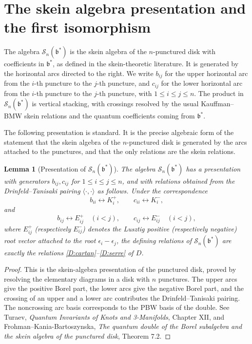 \documentclass[11pt]{article}
\newcommand{\bcS}{\mathcal S}
\newcommand{\fb}{\mathfrak b}
\newcommand{\la}{\langle}
\newcommand{\ra}{\rangle}
\newtheorem{lemma}[theorem]{Lemma}
\theoremstyle{definition}
\theoremstyle{remark}
\begin{document}
\section{The skein algebra presentation and the first isomorphism}

The algebra \(\bcS_n(\fb^*)\) is the skein algebra of the \(n\)-punctured
disk with coefficients in \(\fb^*\), as defined in the skein-theoretic
literature.  It is generated by the horizontal arcs directed to the right.
We write \(b_{ij}\) for the upper horizontal arc from the \(i\)-th puncture to
the \(j\)-th puncture, and \(c_{ij}\) for the lower horizontal arc from the
\(i\)-th puncture to the \(j\)-th puncture, with \(1\le i\le j\le n\).  The
product in \(\bcS_n(\fb^*)\) is vertical stacking, with crossings resolved by
the usual Kauffman--BMW skein relations and the quantum coefficients coming
from \(\fb^*\).

The following presentation is standard.  It is the precise algebraic form of
the statement that the skein algebra of the \(n\)-punctured disk is generated
by the arcs attached to the punctures, and that the only relations are the
skein relations.

\begin{lemma}[Presentation of \(\bcS_n(\fb^*)\)]\label{lem:skein-presentation}
The algebra \(\bcS_n(\fb^*)\) has a presentation with generators
\(b_{ij},c_{ij}\) for \(1\le i\le j\le n\), and with relations obtained from
the Drinfeld--Tanisaki pairing \(\la\cdot,\cdot\ra\) as follows.  Under the
correspondence
\[
b_{ii}\longleftrightarrow K_i^+,\qquad
c_{ii}\longleftrightarrow K_i^-,
\]
and
\[
b_{ij}\longleftrightarrow E_{ij}^+\quad (i<j),\qquad
c_{ij}\longleftrightarrow E_{ij}^-\quad (i<j),
\]
where \(E_{ij}^+\) (respectively \(E_{ij}^-\)) denotes the Lusztig positive
(respectively negative) root vector attached to the root \(\epsilon_i-\epsilon_j\),
the defining relations of \(\bcS_n(\fb^*)\) are exactly the relations
\eqref{D:cartan}--\eqref{D:serre} of \(D\).
\end{lemma}

\begin{proof}
This is the skein-algebra presentation of the punctured disk, proved by
resolving the elementary diagrams in a disk with \(n\) punctures.  The
upper arcs give the positive Borel part, the lower arcs give the negative Borel
part, and the crossing of an upper and a lower arc contributes the
Drinfeld--Tanisaki pairing.  The noncrossing arc basis corresponds to the PBW
basis of the double.  See Turaev, \emph{Quantum Invariants of Knots and
3-Manifolds}, Chapter XII, and Frohman--Kania-Bartoszynska, \emph{The quantum
double of the Borel subalgebra and the skein algebra of the punctured disk},
Theorem 7.2.
\end{proof}
\end{document}
